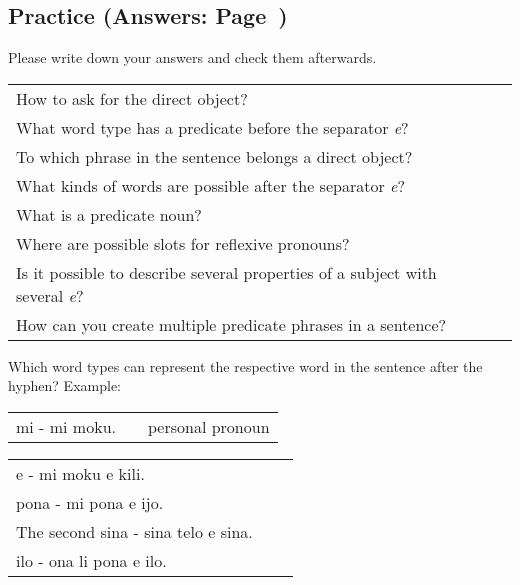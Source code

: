 %
\newpage
\subsection*{Practice (Answers: Page~\pageref{'direct_objects_compund_sentences'})}
%
Please write down your answers and check them afterwards.

\begin{supertabular}{p{5,5cm}|ll}
    How to ask for the direct object?                                                   &  & \\ %
    What word type has a predicate before the separator \textit{e}?                     &  & \\ %
    To which phrase in the sentence belongs a direct object?                            &  & \\ %
    What kinds of words are possible after the separator \textit{e}?                    &  & \\ %
    What is a predicate noun?                                                           &  & \\ %
    Where are possible slots for reflexive pronouns?                                    &  & \\ %
    Is it possible to describe several properties of a subject with several \textit{e}? &  & \\ %
    How can you create multiple predicate phrases in a sentence?                        &  & \\ %
\end{supertabular}

Which word types can represent the respective word in the sentence after the hyphen?
Example:

\begin{supertabular}{p{5,5cm}|ll}
    mi - mi moku. &  & personal pronoun \\ %
\end{supertabular}

\begin{supertabular}{p{5,5cm}|ll}
    e - mi moku e kili.                 &  & \\ %
    pona - mi pona e ijo.               &  & \\ %
    The second sina - sina telo e sina. &  & \\ %
    ilo - ona li pona e ilo.            &  & \\ %
\end{supertabular}

